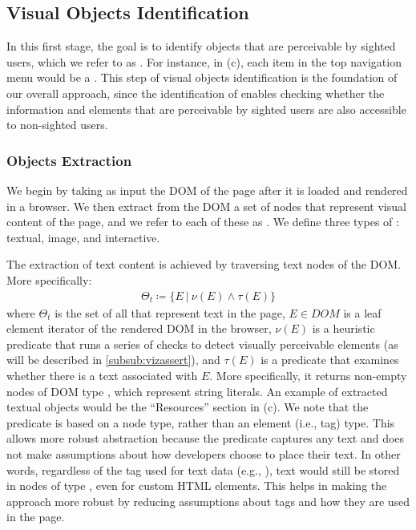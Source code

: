 \subsection{Visual Objects Identification}
In this first stage,
the goal is to identify objects that 
are perceivable by sighted users, which we refer to as \emph{\vizobjs}. 
For instance, in (c), 
each item in the top navigation menu would be a {\vizobj}. 
This step of visual objects identification is the 
foundation of our overall approach, 
since the identification of {\vizobjs} enables checking whether the information
and elements that are perceivable by sighted users 
are also accessible to non-sighted users. 
 

\subsubsection{Objects Extraction}\label{subsec:extraction}

We begin by taking as input the DOM of the page 
after it is loaded and rendered in a browser. We 
then extract from the DOM a set of nodes that 
represent visual content of the page, 
and we refer to each of these as \emph{{\VizObjs}}.
We define three types of {\VizObjs}:
textual, image, and interactive.

The extraction of text content is achieved by 
traversing text nodes of the DOM. More specifically:
\begin{align}
    \Theta_{t} \coloneqq \{ E \:\vert\: \nu(E) \land \tau(E) \}
\end{align}
where $\Theta_{t}$ is the set of all {\vizobjs} that represent text in the page,
$E \in DOM$ is a leaf element iterator of the rendered DOM in the browser,
$\nu(E)$ is a heuristic predicate that runs a series of checks
to detect visually perceivable elements (as will be described in \cref{subsub:vizassert}),
and $\tau(E)$ is a predicate that examines whether
there is a text associated with $E$. 
More specifically, it returns
non-empty nodes of DOM type ,
which represent string literals. 
An example of extracted textual objects would be the ``Resources'' section in 
(c).
We note that the predicate is based on a node type, rather than
an element (i.e., tag) type.
This allows more robust abstraction because the predicate captures any text and does not
make assumptions about how developers choose to place their text.
In other words, regardless of the tag used for text data (e.g., ),
text would still be stored in nodes of type , even for custom HTML elements.
This helps in making the approach more robust by reducing assumptions about
tags and how they are used in the page.


